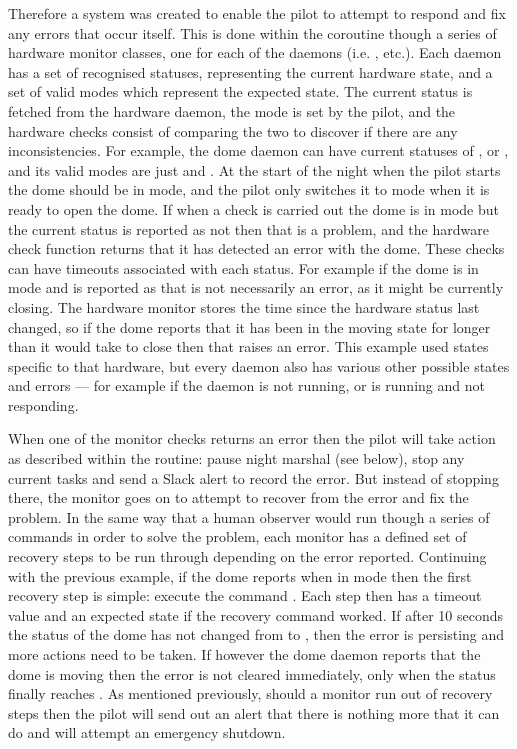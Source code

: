 \begin{colsection}
\begin{colsection}
Therefore a system was created to enable the pilot to attempt to respond and fix any errors that occur itself. This is done within the  coroutine though a series of hardware monitor  classes, one for each of the daemons (i.e. ,  etc.). Each daemon has a set of recognised statuses, representing the current hardware state, and a set of valid modes which represent the expected state. The current status is fetched from the hardware daemon, the mode is set by the pilot, and the hardware checks consist of comparing the two to discover if there are any inconsistencies. For example, the dome daemon can have current statuses of ,  or , and its valid modes are just  and . At the start of the night when the pilot starts the dome should be in  mode, and the pilot only switches it to  mode when it is ready to open the dome. If when a check is carried out the dome is in  mode but the current status is reported as not  then that is a problem, and the hardware check function returns that it has detected an error with the dome. These checks can have timeouts associated with each status. For example if the dome is in  mode and is reported as  that is not necessarily an error, as it might be currently closing. The hardware monitor stores the time since the hardware status last changed, so if the dome reports that it has been in the moving state for longer than it would take to close then that raises an error. This example used states specific to that hardware, but every daemon also has various other possible states and errors --- for example if the daemon is not running, or is running and not responding.

When one of the monitor checks returns an error then the pilot will take action as described within the  routine: pause night marshal (see below), stop any current tasks and send a Slack alert to record the error. But instead of stopping there, the monitor goes on to attempt to recover from the error and fix the problem. In the same way that a human observer would run though a series of commands in order to solve the problem, each monitor has a defined set of recovery steps to be run through depending on the error reported. Continuing with the previous example, if the dome reports  when in  mode then the first recovery step is simple: execute the command . Each step then has a timeout value and an expected state if the recovery command worked. If after 10 seconds the status of the dome has not changed from  to , then the error is persisting and more actions need to be taken. If however the dome daemon reports that the dome is moving then the error is not cleared immediately, only when the status finally reaches . As mentioned previously, should a monitor run out of recovery steps then the pilot will send out an alert that there is nothing more that it can do and will attempt an emergency shutdown.


\end{colsection}
\end{colsection}
